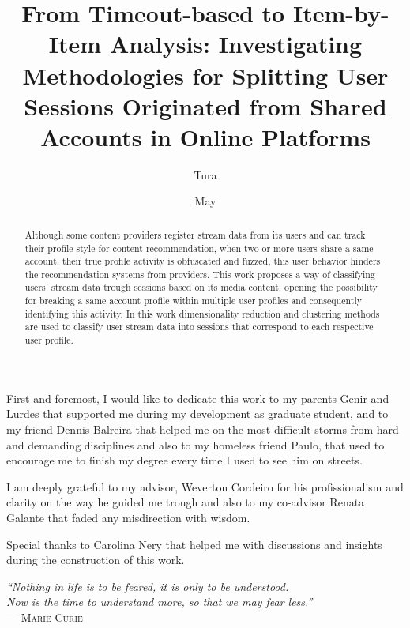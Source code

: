 \documentclass[ecp,tc,english]{iiufrgs}
\title{From Timeout-based to Item-by-Item Analysis: Investigating Methodologies for Splitting User Sessions Originated from Shared Accounts in Online Platforms}
\author{Tura}{Matheus Toazza}
\date{May}{2021}
\begin{document}
\maketitle

\begin{acknowledgements}
First and foremost, I would like to dedicate this work to my parents Genir and Lurdes that supported me during my development as graduate student, and to my friend Dennis Balreira that helped me on the most difficult storms from hard and demanding disciplines and also to my homeless friend Paulo, that used to encourage me to finish my degree every time I used to see him on streets.

I am deeply grateful to my advisor, Weverton Cordeiro for his profissionalism and clarity on the way he guided me trough and also to my co-advisor Renata Galante that faded any misdirection with wisdom.

Special thanks to Carolina Nery that helped me with discussions and insights during the construction of this work.
\end{acknowledgements}

\clearpage
\begin{flushright}
    \mbox{}
    \vfill
    {\sffamily\itshape
      ``Nothing in life is to be feared, it is only to be understood.\\
      Now is the time to understand more, so that we may fear less.''\\}
    --- \textsc{Marie Curie}
\end{flushright}

\begin{abstract}
  Although some content providers register stream data from its users and can track their profile style for content recommendation, when two or more users share a same account, their true profile activity is obfuscated and fuzzed, this user behavior hinders the recommendation systems from providers. This work proposes a way of classifying users' stream data trough sessions based on its media content, opening the possibility for breaking a same account profile within multiple user profiles and consequently identifying this activity. In this work dimensionality reduction and clustering methods are used to classify user stream data into sessions that correspond to each respective user profile.
\end{abstract}
\end{document}
